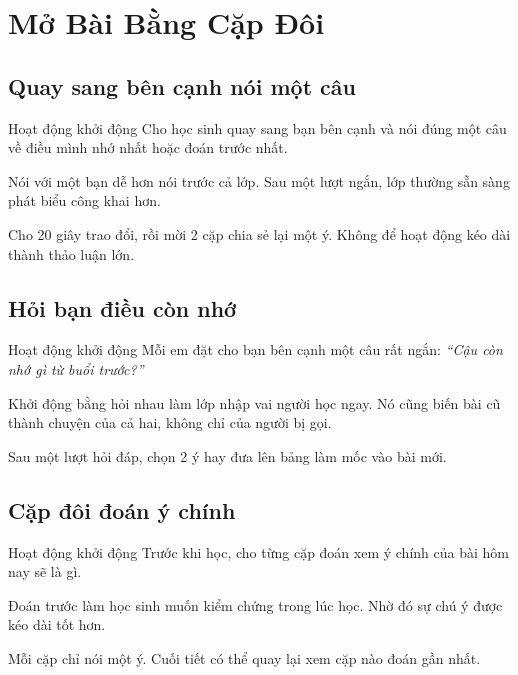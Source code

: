 \chapter{Mở Bài Bằng Cặp Đôi}

\section{Quay sang bên cạnh nói một câu}
\begin{khoidongbox}{Hoạt động khởi động}
Cho học sinh quay sang bạn bên cạnh và nói đúng một câu về điều mình nhớ nhất hoặc đoán trước nhất.
\end{khoidongbox}
\begin{visaohieuqua}
Nói với một bạn dễ hơn nói trước cả lớp. Sau một lượt ngắn, lớp thường sẵn sàng phát biểu công khai hơn.
\end{visaohieuqua}
\begin{cachlam5phut}
Cho 20 giây trao đổi, rồi mời 2 cặp chia sẻ lại một ý. Không để hoạt động kéo dài thành thảo luận lớn.
\end{cachlam5phut}
\ngancach

\section{Hỏi bạn điều còn nhớ}
\begin{khoidongbox}{Hoạt động khởi động}
Mỗi em đặt cho bạn bên cạnh một câu rất ngắn: \textit{``Cậu còn nhớ gì từ buổi trước?''}
\end{khoidongbox}
\begin{visaohieuqua}
Khởi động bằng hỏi nhau làm lớp nhập vai người học ngay. Nó cũng biến bài cũ thành chuyện của cả hai, không chỉ của người bị gọi.
\end{visaohieuqua}
\begin{cachlam5phut}
Sau một lượt hỏi đáp, chọn 2 ý hay đưa lên bảng làm mốc vào bài mới.
\end{cachlam5phut}
\ngancach

\section{Cặp đôi đoán ý chính}
\begin{khoidongbox}{Hoạt động khởi động}
Trước khi học, cho từng cặp đoán xem ý chính của bài hôm nay sẽ là gì.
\end{khoidongbox}
\begin{visaohieuqua}
Đoán trước làm học sinh muốn kiểm chứng trong lúc học. Nhờ đó sự chú ý được kéo dài tốt hơn.
\end{visaohieuqua}
\begin{cachlam5phut}
Mỗi cặp chỉ nói một ý. Cuối tiết có thể quay lại xem cặp nào đoán gần nhất.
\end{cachlam5phut}
\ngancach

